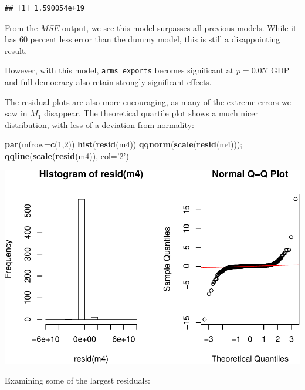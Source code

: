 \documentclass[11pt,]{article}
\newenvironment{Shaded}{\begin{snugshade}}{\end{snugshade}}
\newcommand{\DataTypeTok}[1]{\textcolor[rgb]{0.13,0.29,0.53}{#1}}
\newcommand{\DecValTok}[1]{\textcolor[rgb]{0.00,0.00,0.81}{#1}}
\newcommand{\KeywordTok}[1]{\textcolor[rgb]{0.13,0.29,0.53}{\textbf{#1}}}
\newcommand{\NormalTok}[1]{#1}
\newcommand{\StringTok}[1]{\textcolor[rgb]{0.31,0.60,0.02}{#1}}
\begin{document}
\begin{verbatim}
## [1] 1.590054e+19
\end{verbatim}

From the \(MSE\) output, we see this model surpasses all previous
models. While it has 60 percent less error than the dummy model, this is
still a disappointing result.

However, with this model, \texttt{arms\_exports} becomes significant at
\(p = 0.05\)! GDP and full democracy also retain strongly significant
effects.

The residual plots are also more encouraging, as many of the extreme
errors we saw in \(M_1\) disappear. The theoretical quartile plot shows
a much nicer distribution, with less of a deviation from normality:

\begin{Shaded}
\begin{Highlighting}[]
\KeywordTok{par}\NormalTok{(}\DataTypeTok{mfrow=}\KeywordTok{c}\NormalTok{(}\DecValTok{1}\NormalTok{,}\DecValTok{2}\NormalTok{))}
\KeywordTok{hist}\NormalTok{(}\KeywordTok{resid}\NormalTok{(m4))}
\KeywordTok{qqnorm}\NormalTok{(}\KeywordTok{scale}\NormalTok{(}\KeywordTok{resid}\NormalTok{(m4))); }\KeywordTok{qqline}\NormalTok{(}\KeywordTok{scale}\NormalTok{(}\KeywordTok{resid}\NormalTok{(m4)), }\DataTypeTok{col=}\StringTok{'2'}\NormalTok{)}
\end{Highlighting}
\end{Shaded}

\includegraphics{report_files/figure-latex/unnamed-chunk-22-1.pdf}

Examining some of the largest residuals:
\end{document}
